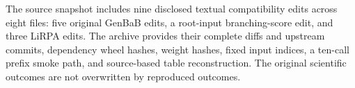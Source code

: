 The source snapshot includes nine disclosed textual compatibility edits
across eight files: five original GenBaB edits, a root-input branching-score
edit, and three LiRPA edits. The archive provides their complete diffs and
upstream commits, dependency wheel hashes, weight hashes, fixed input indices,
a ten-call prefix smoke path, and source-based table reconstruction. The
original scientific outcomes are not overwritten by reproduced outcomes.
